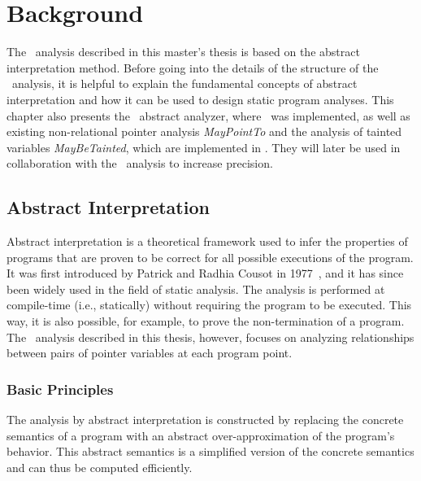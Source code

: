\chapter{Background}\label{chapter:background}

The \cpo\ analysis described in this master's thesis is based on the abstract interpretation method.
Before going into the details of the structure of the \cpo\ analysis,
it is helpful to explain the fundamental concepts of abstract interpretation and how it can be used to design static program analyses.
This chapter also presents the \goblint\ abstract analyzer, where \cpo\ was implemented, as well as existing non-relational pointer analysis \emph{MayPointTo} and the analysis of tainted variables \emph{MayBeTainted}, which are implemented in \goblint.
They will later be used in collaboration with the \cpo\ analysis to increase precision.

\section{Abstract Interpretation}

Abstract interpretation is a theoretical framework used to infer the properties of programs that are proven to be correct for all possible executions of the program.
It was first introduced by Patrick and Radhia Cousot in 1977~\cite{ai}, and it has since been widely used in the field of static analysis.
The analysis is performed at compile-time (i.e., statically) without requiring the program to be executed.
This way, it is also possible, for example, to prove the non-termination of a program.
The \cpo\ analysis described in this thesis, however, focuses on analyzing
relationships between pairs of pointer variables at each program point.

\subsection{Basic Principles}

The analysis by abstract interpretation is constructed by replacing the concrete
semantics of a program with an abstract over-approximation of the program's behavior.
This abstract semantics is a simplified version of the concrete semantics
and can thus be computed efficiently.

